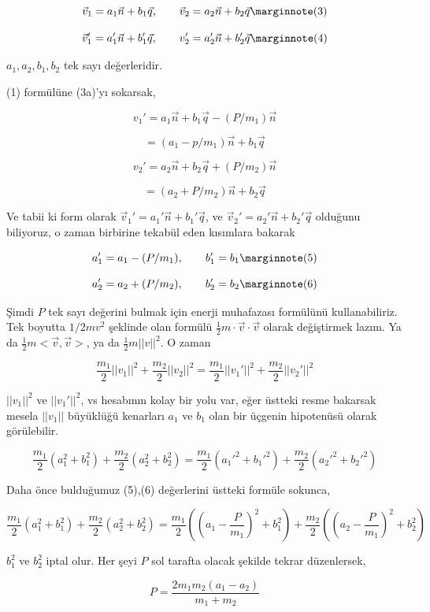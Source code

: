 \documentclass[12pt,fleqn]{article}\usepackage{../../common}
\begin{document}
$$
\vec{v}_1 = a_1 \vec{n} + b_1 \vec{q}, \qquad \vec{v}_2 = a_2 \vec{n} + b_2 \vec{q}
\mlabel{3}
$$

$$
\vec{v}_1' = a_1' \vec{n} + b_1' \vec{q}, \qquad v_2' = a_2' \vec{n} + b_2' \vec{q}
\mlabel{4}
$$

$a_1,a_2,b_1,b_2$ tek sayı değerleridir. 

(1) formülüne (3a)'yı sokarsak,

$$
v_1' = a_1 \vec{n} + b_1 \vec{q} - (P/m_1) \vec{n}
$$

$$
 = (a_1 - p/m_1) \vec{n} + b_1 \vec{q}
$$


$$
v_2' = a_2 \vec{n} + b_2 \vec{q} + (P/m_2) \vec{n}
$$

$$
= (a_2 + P/m_2) \vec{n} + b_2 \vec{q}
$$

Ve tabii ki form olarak $\vec{v}_1' = a_1' \vec{n} + b_1' \vec{q}$, ve
$\vec{v}_2' = a_2' \vec{n} + b_2' \vec{q}$ olduğunu biliyoruz, o zaman birbirine
tekabül eden kısımlara bakarak

$$
a_1' = a_1 - (P/m_1), \qquad b_1' = b_1
\mlabel{5}
$$

$$
a_2' = a_2 + (P/m_2), \qquad b_2' = b_2
\mlabel{6}
$$

Şimdi $P$ tek sayı değerini bulmak için enerji muhafazası formülünü
kullanabiliriz. Tek boyutta $1/2 m v^2$ şeklinde olan formülü $\frac{1}{2} m
\cdot \vec{v}\cdot\vec{v}$ olarak değiştirmek lazım. Ya da $\frac{1}{2} m
<\vec{v},\vec{v}>$, ya da $\frac{1}{2} m ||v||^2$.  O zaman

$$
\frac{m_1}{2} ||v_1||^2 + \frac{m_2}{2} ||v_2||^2  =
\frac{m_1}{2} ||v_1'||^2 + \frac{m_2}{2} ||v_2'||^2 
$$

$||v_1||^2$ ve $||v_1'||^2$, vs hesabının kolay bir yolu var, eğer üstteki resme
bakarsak mesela $||v_1||$ büyüklüğü kenarları $a_1$ ve $b_1$ olan bir üçgenin
hipotenüsü olarak görülebilir.

$$
\frac{m_1}{2} (a_1^2+b_1^2) + \frac{m_2}{2} (a_2^2+b_2^2) =
\frac{m_1}{2} (a_1'^2+b_1'^2) + \frac{m_2}{2} (a_2'^2+b_2'^2) 
$$

Daha önce bulduğumuz (5),(6) değerlerini üstteki formüle sokunca,

$$
\frac{m_1}{2} (a_1^2+b_1^2) + \frac{m_2}{2} (a_2^2+b_2^2) =
\frac{m_1}{2} \left( \left(a_1-\frac{P}{m_1} \right)^2 + b_1^2 \right)  +
\frac{m_2}{2} \left( \left(a_2-\frac{P}{m_1} \right)^2 + b_2^2 \right) 
$$

$b_1^2$ ve $b_2^2$ iptal olur. Her şeyi $P$ sol tarafta olacak şekilde tekrar
düzenlersek,

$$
P = \frac{2 m_1 m_2 (a_1-a_2)}{m_1+m_2}
$$
\end{document}
